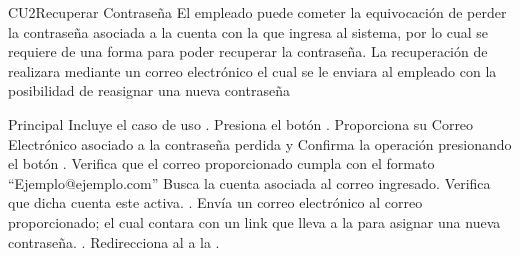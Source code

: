 \begin{UseCase}{CU2}{Recuperar Contraseña}{
		El empleado puede cometer la equivocación de perder la contraseña asociada a la cuenta con la que ingresa al sistema, por lo cual se requiere de una forma para poder recuperar la contraseña. La recuperación de realizara mediante un correo electrónico el cual se le enviara al empleado con la posibilidad de reasignar una nueva contraseña
	}

	\end{UseCase}
	\begin{UCtrayectoria}{Principal}
		\UCpaso Incluye el caso de uso .
		\UCpaso[\UCactor] Presiona el botón .
		\UCpaso [\UCactor] Proporciona su Correo Electrónico asociado a la contraseña perdida y  Confirma la operación presionando el botón  .		
		\UCpaso Verifica que el correo proporcionado cumpla con el formato ``Ejemplo@ejemplo.com'' 
		\UCpaso Busca la cuenta asociada al correo ingresado. 
		\UCpaso Verifica que dicha cuenta este activa. .
		\UCpaso Envía un correo electrónico al correo proporcionado; el cual contara con un link que lleva a la  para asignar una nueva contraseña. .
		\UCpaso Redirecciona al \UCactor a la  .
	\end{UCtrayectoria}

